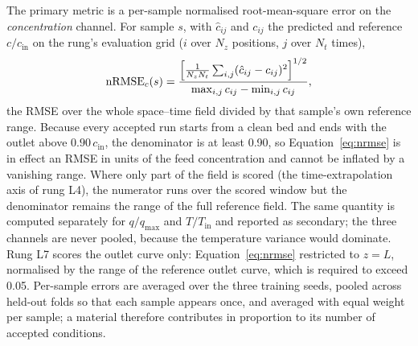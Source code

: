 The primary metric is a per-sample normalised root-mean-square error on the
\emph{concentration} channel. For sample \(s\), with \(\hat c_{ij}\) and \(c_{ij}\) the
predicted and reference \(c/c_{\mathrm{in}}\) on the rung's evaluation grid
(\(i\) over \(N_z\) positions, \(j\) over \(N_t\) times),
\begin{equation}
\mathrm{nRMSE}_c(s) = \frac{\Bigl[\frac{1}{N_zN_t}\sum_{i,j}(\hat c_{ij}-c_{ij})^2\Bigr]^{1/2}}
{\max_{i,j} c_{ij} - \min_{i,j} c_{ij}} ,
\label{eq:nrmse}
\end{equation}
the RMSE over the whole space--time field divided by that sample's own reference range.
Because every accepted run starts from a clean bed and ends with the outlet above
\(0.90\,c_{\mathrm{in}}\), the denominator is at least 0.90, so
Equation~\eqref{eq:nrmse} is in effect an RMSE in units of the feed concentration and
cannot be inflated by a vanishing range.
Where only part of the field is scored (the time-extrapolation axis of rung L4), the
numerator runs over the scored window but the denominator remains the range of the full
reference field.
The same quantity is computed separately for \(q/q_{\max}\) and \(T/T_{\mathrm{in}}\) and
reported as secondary; the three channels are never pooled, because the temperature
variance would dominate.
Rung L7 scores the outlet curve only: Equation~\eqref{eq:nrmse} restricted to \(z = L\),
normalised by the range of the reference outlet curve, which is required to exceed 0.05.
Per-sample errors are averaged over the three training seeds, pooled across held-out
folds so that each sample appears once, and averaged with equal weight per sample; a
material therefore contributes in proportion to its number of accepted conditions.

